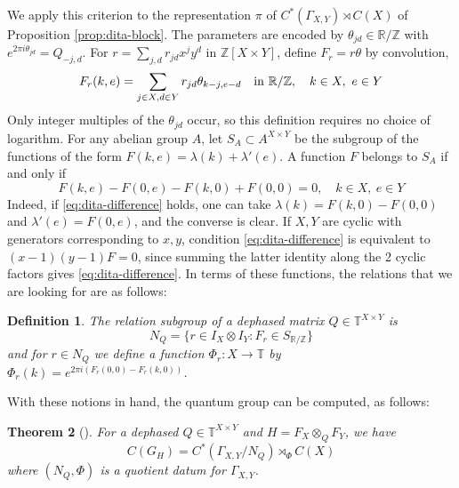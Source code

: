 \documentclass[11pt,reqno]{amsart}
\newtheorem{thm}{Theorem}[section]
\newtheorem{defi}[thm]{Definition}
\theoremstyle{definition}
\numberwithin{equation}{section}
\begin{document}
We apply this criterion to the representation $\pi$ of $C^*(\Gamma_{X,Y})\rtimes C(X)$ of Proposition \ref{prop:dita-block}. The parameters are encoded by $\theta_{jd}\in\mathbb R/\mathbb Z$ with $e^{2\pi i\theta_{jd}}=Q_{-j,d}$. For $r=\sum_{j,d}r_{jd}x^jy^d$ in $\mathbb Z[X\times Y]$, define $F_r=r\theta$ by convolution,
\begin{equation}\label{eq:dita-convolution}
F_r(k,e)=\sum_{j\in X,d\in Y}r_{jd}\theta_{k-j,e-d}
\quad{\rm in}\ \mathbb R/\mathbb Z,
\quad k\in X,\ e\in Y
\end{equation}
Only integer multiples of the $\theta_{jd}$ occur, so this definition requires no choice of logarithm. For any abelian group $A$, let $S_A\subset A^{X\times Y}$ be the subgroup of the functions of the form $F(k,e)=\lambda(k)+\lambda'(e)$. A function $F$ belongs to $S_A$ if and only if
\begin{equation}\label{eq:dita-difference}
F(k,e)-F(0,e)-F(k,0)+F(0,0)=0,
\quad k\in X,\ e\in Y
\end{equation}
Indeed, if \eqref{eq:dita-difference} holds, one can take $\lambda(k)=F(k,0)-F(0,0)$ and $\lambda'(e)=F(0,e)$, and the converse is clear. If $X,Y$ are cyclic with generators corresponding to $x,y$, condition \eqref{eq:dita-difference} is equivalent to $(x-1)(y-1)F=0$, since summing the latter identity along the 2 cyclic factors gives \eqref{eq:dita-difference}. In terms of these functions, the relations that we are looking for are as follows:

\begin{defi}
The relation subgroup of a dephased matrix $Q\in\mathbb T^{X\times Y}$ is
$$N_Q=\{r\in I_X\otimes I_Y:F_r\in S_{\mathbb R/\mathbb Z}\}$$
and for $r\in N_Q$ we define a function $\Phi_r:X\to\mathbb T$ by $\Phi_r(k)=e^{2\pi i(F_r(0,0)-F_r(k,0))}$.
\end{defi}

With these notions in hand, the quantum group can be computed, as follows:

\begin{thm}[\cite{BO26}]\label{thm:dita-all}
For a dephased $Q\in\mathbb T^{X\times Y}$ and $H=F_X\otimes_QF_Y$, we have
$$C(G_H)=C^*(\Gamma_{X,Y}/N_Q)\rtimes_\Phi C(X)$$
where $(N_Q,\Phi)$ is a quotient datum for $\Gamma_{X,Y}$.
\end{thm}
\end{document}
